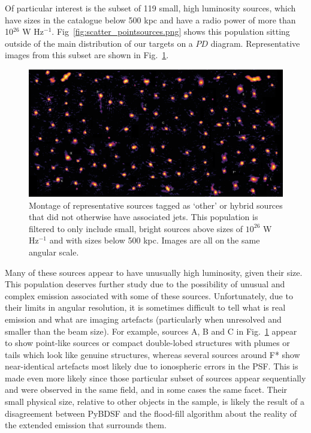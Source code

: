 \documentclass{aa}
\begin{document}
Of particular interest is the subset of 119 small, high luminosity sources, which have sizes in the \cite{hardcastle23} catalogue below 500 kpc and have a radio power of more than 10$^{26}$ W Hz$^{-1}$. Fig~\ref{fig:scatter_pointsources.png} shows this population sitting outside of the main distribution of our targets on a $PD$ diagram. Representative images from this subset are shown in Fig.~\ref{fig:pointsources.png}. 

\begin{figure}
\includegraphics[width=1\linewidth]{Images/galaxies/pointsources.png}
\caption{Montage of representative sources tagged as `other' or hybrid sources that did not otherwise have associated jets. This population is filtered to only include small, bright sources above sizes of $10^{26}$ W Hz$^{-1}$ and with sizes below 500 kpc. Images are all on the same angular scale.}
\label{fig:pointsources.png}
\end{figure}

Many of these sources appear to have unusually high luminosity, given their size. This population deserves further study due to the possibility of unusual and complex emission associated with some of these sources. Unfortunately, due to their limits in angular resolution, it is sometimes difficult to tell what is real emission and what are imaging artefacts (particularly when unresolved and smaller than the beam size). For example, sources A, B and C in Fig.~\ref{fig:pointsources.png} appear to show point-like sources or compact double-lobed structures with plumes or tails which look like genuine structures, whereas several sources around F* show near-identical artefacts most likely due to ionospheric errors in the PSF. This is made even more likely since those particular subset of sources appear sequentially and were observed in the same field, and in some cases the same facet. Their small physical size, relative to other objects in the sample, is likely the result of a disagreement between PyBDSF and the flood-fill algorithm about the reality of the extended emission that surrounds them.
\end{document}
